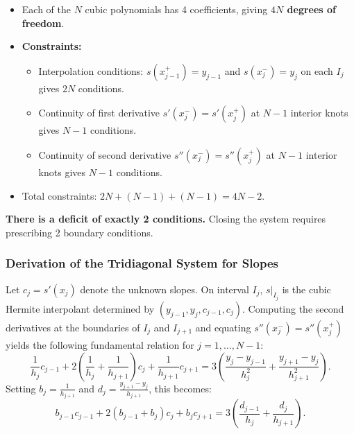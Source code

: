 \begin{theorem}
    \begin{itemize}
        \item Each of the $N$ cubic polynomials has 4 coefficients, giving \textbf{$4N$ degrees of freedom}.
        \item \textbf{Constraints:}
        \begin{itemize}
            \item Interpolation conditions: $s(x_{j-1}^+) = y_{j-1}$ and $s(x_j^-) = y_j$ on each $I_j$ gives $2N$ conditions.
            \item Continuity of first derivative $s'(x_j^-) = s'(x_j^+)$ at $N-1$ interior knots gives $N-1$ conditions.
            \item Continuity of second derivative $s''(x_j^-) = s''(x_j^+)$ at $N-1$ interior knots gives $N-1$ conditions.
        \end{itemize}
        \item Total constraints: $2N + (N - 1) + (N - 1) = 4N - 2$.
    \end{itemize}
    \textbf{There is a deficit of exactly 2 conditions.} Closing the system requires prescribing 2 boundary conditions.
\end{theorem}

\subsubsection{Derivation of the Tridiagonal System for Slopes}
Let $c_j = s'(x_j)$ denote the unknown slopes. On interval $I_j$, $s|_{I_j}$ is the cubic Hermite interpolant determined by $(y_{j-1}, y_j, c_{j-1}, c_j)$. Computing the second derivatives at the boundaries of $I_j$ and $I_{j+1}$ and equating $s''(x_j^-) = s''(x_j^+)$ yields the following fundamental relation for $j = 1, \dots, N-1$:
\begin{equation}
    \frac{1}{h_j} c_{j-1} + 2\left(\frac{1}{h_j} + \frac{1}{h_{j+1}}\right) c_j + \frac{1}{h_{j+1}} c_{j+1} = 3\left( \frac{y_j - y_{j-1}}{h_j^2} + \frac{y_{j+1} - y_j}{h_{j+1}^2} \right).
\end{equation}
Setting $b_j = \frac{1}{h_{j+1}}$ and $d_j = \frac{y_{j+1} - y_j}{h_{j+1}}$, this becomes:
\begin{equation}
    b_{j-1} c_{j-1} + 2(b_{j-1} + b_j) c_j + b_j c_{j+1} = 3\left( \frac{d_{j-1}}{h_j} + \frac{d_j}{h_{j+1}} \right).
\end{equation}

